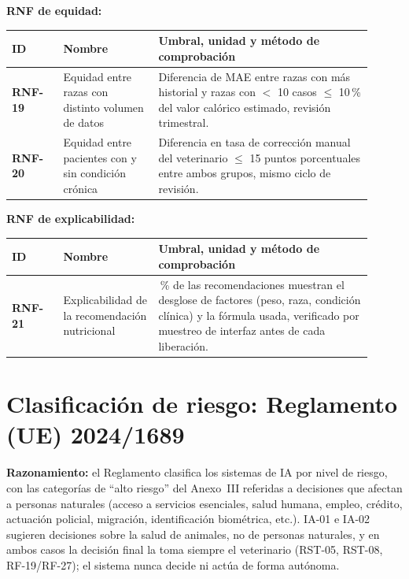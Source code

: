 \textbf{RNF de equidad:}

\begin{longtable}{@{}>{\bfseries}p{0.13\linewidth} >{\raggedright\arraybackslash}p{0.24\linewidth} >{\raggedright\arraybackslash}p{0.54\linewidth}@{}}
\toprule
\textbf{ID} & \textbf{Nombre} & \textbf{Umbral, unidad y método de comprobación} \\
\midrule
\endhead
\bottomrule
\endlastfoot
RNF-19 & Equidad entre razas con distinto volumen de datos & Diferencia de MAE entre razas con más historial y razas con $<$ 10 casos $\leq$ 10\,\% del valor calórico estimado, revisión trimestral. \\
RNF-20 & Equidad entre pacientes con y sin condición crónica & Diferencia en tasa de corrección manual del veterinario $\leq$ 15 puntos porcentuales entre ambos grupos, mismo ciclo de revisión. \\
\end{longtable}

\textbf{RNF de explicabilidad:}

\begin{longtable}{@{}>{\bfseries}p{0.13\linewidth} >{\raggedright\arraybackslash}p{0.24\linewidth} >{\raggedright\arraybackslash}p{0.54\linewidth}@{}}
\toprule
\textbf{ID} & \textbf{Nombre} & \textbf{Umbral, unidad y método de comprobación} \\
\midrule
\endhead
\bottomrule
\endlastfoot
RNF-21 & Explicabilidad de la recomendación nutricional & 100\,\% de las recomendaciones muestran el desglose de factores (peso, raza, condición clínica) y la fórmula usada, verificado por muestreo de interfaz antes de cada liberación. \\
\end{longtable}

\section{Clasificación de riesgo: Reglamento (UE) 2024/1689}
\label{sec:clasificacion-riesgo}

\textbf{Razonamiento:} el Reglamento clasifica los sistemas de IA por nivel de riesgo, con las categorías de ``alto riesgo'' del Anexo~III referidas a decisiones que afectan a personas naturales (acceso a servicios esenciales, salud humana, empleo, crédito, actuación policial, migración, identificación biométrica, etc.). IA-01 e IA-02 sugieren decisiones sobre la salud de animales, no de personas naturales, y en ambos casos la decisión final la toma siempre el veterinario (RST-05, RST-08, RF-19/RF-27); el sistema nunca decide ni actúa de forma autónoma.

